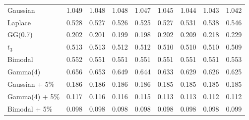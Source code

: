 \begin{tabular}{lcccccccc}
Gaussian & 1.049 & 1.048 & 1.048 & 1.047 & 1.045 & 1.044 & 1.043 & 1.042 \\
Laplace & 0.528 & 0.527 & 0.526 & 0.525 & 0.527 & 0.531 & 0.538 & 0.546 \\
GG(0.7) & 0.202 & 0.201 & 0.199 & 0.198 & 0.202 & 0.209 & 0.218 & 0.229 \\
$t_3$ & 0.513 & 0.513 & 0.512 & 0.512 & 0.510 & 0.510 & 0.510 & 0.509 \\
Bimodal & 0.552 & 0.551 & 0.551 & 0.551 & 0.551 & 0.551 & 0.551 & 0.553 \\
Gamma(4) & 0.656 & 0.653 & 0.649 & 0.644 & 0.633 & 0.629 & 0.626 & 0.625 \\
Gaussian + 5\% & 0.186 & 0.186 & 0.186 & 0.186 & 0.185 & 0.185 & 0.185 & 0.185 \\
Gamma(4) + 5\% & 0.117 & 0.116 & 0.116 & 0.115 & 0.113 & 0.113 & 0.112 & 0.112 \\
Bimodal + 5\% & 0.098 & 0.098 & 0.098 & 0.098 & 0.098 & 0.098 & 0.098 & 0.099 \\
\bottomrule
\end{tabular}
